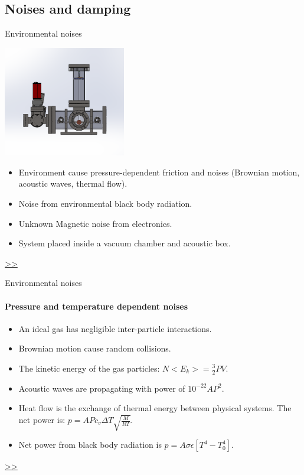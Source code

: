 \documentclass{beamer}
\begin{document}
\subsection{Noises and damping}
\begin{frame}{Environmental noises}
	\begin{center}		
		\includegraphics[width=0.4\textwidth,keepaspectratio]{total_chamber.png}
    \end{center}
	\begin{itemize}
		
		\item Environment cause pressure-dependent friction and noises (Brownian motion, acoustic waves, thermal flow).  
		\item Noise from environmental black body radiation.
		\item Unknown Magnetic noise from electronics.
		\pause
		\item System placed inside a vacuum chamber and acoustic box. 
			
	\end{itemize}
	\hyperlink{frame:Proportional–integral–derivative (PID) controller}{>>} 
\end{frame}
\begin{frame}{Environmental noises}
	\framesubtitle{Pressure and temperature dependent noises}
	\begin{itemize}
		\item An ideal gas has negligible inter-particle interactions.
		\item Brownian motion cause random collisions. 
		\item The kinetic energy of the gas particles: $ N<E_k> = \frac{3}{2} PV$.
		\item Acoustic waves are propagating with power of $10^{-22}AP^2$.
		\item Heat flow is the exchange of thermal energy between physical systems. The net power is: $p= A P c_v \Delta T \sqrt{\frac{M}{RT}} $.
		\item Net power from black body radiation is $p= A \sigma\epsilon[ T^4- T_0^4]$.
		
	\end{itemize}
	\hyperlink{frame:Proportional–integral–derivative (PID) controller}{>>} 
\end{frame}
\end{document}

